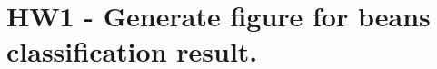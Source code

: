 \chapter{HW1 -\/ Generate figure for beans classification result.}
\hypertarget{md__e_1_2_git_hub_2_p_r_m_l___code_2src_2hw1_2readme}{}\label{md__e_1_2_git_hub_2_p_r_m_l___code_2src_2hw1_2readme}
\label{md__e_1_2_git_hub_2_p_r_m_l___code_2src_2hw1_2readme_autotoc_md1}%
%
